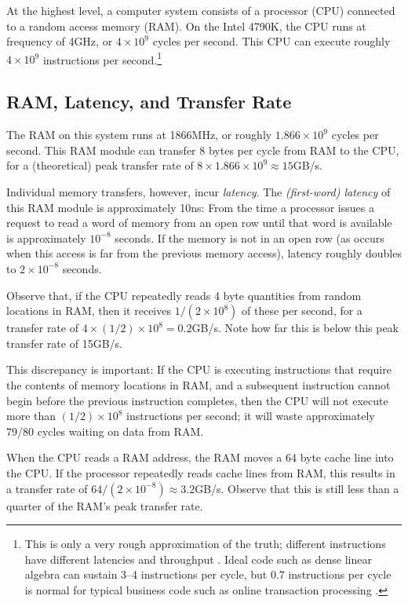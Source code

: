 \documentclass{patmorin}
\begin{document}
At the highest level, a computer system consists of a processor (CPU)
connected to a random access memory (RAM). On the Intel 4790K, the
CPU runs at frequency of 4GHz, or $4\times10^9$ cycles per second.
This CPU can execute roughly $4\times 10^{9}$ instructions per
second.\footnote{This is only a very rough approximation of the
truth; different instructions have different latencies and throughput
\cite{fog:instruction}.  Ideal code such as dense linear algebra can
sustain 3--4 instructions per cycle, but 0.7 instructions per cycle is
normal for typical business code such as online transaction processing
\cite{tozun.pandis.ea:from}.}



\subsection{RAM, Latency, and Transfer Rate}

The RAM on this system runs at 1866MHz, or roughly $1.866\times10^9$
cycles per second.  This RAM module can transfer 8 bytes per cycle
from RAM to the CPU, for a (theoretical) peak transfer rate of $8\times
1.866\times10^9\approx 15$GB/s.

Individual memory transfers, however, incur \emph{latency}.
The \emph{(first-word) latency} of this RAM module is approximately
10ns: From the time a processor issues a request to read a word of
memory from an open row until that word is available is approximately
$10^{-8}$ seconds.  If the memory is not in an open row (as occurs when
this access is far from the previous memory access), latency roughly
doubles to $2\times 10^{-8}$ seconds.

Observe that, if the CPU repeatedly reads 4 byte quantities from random
locations in RAM, then it receives $1/(2\times 10^8)$ of these per second,
for a transfer rate of $4\times(1/2)\times10^8=0.2$GB/s.  Note how far
this is below this peak transfer rate of 15GB/s.

This discrepancy is important: If the CPU is executing instructions
that require the contents of memory locations in RAM, and a subsequent
instruction cannot begin before the previous instruction completes, then
the CPU will not execute more than $(1/2)\times 10^8$ instructions per
second; it will waste approximately 79/80 cycles waiting on data from RAM.

When the CPU reads a RAM address, the RAM moves a 64 byte cache line into
the CPU.  If the processor repeatedly reads cache lines from RAM, this
results in a transfer rate of $64 / (2\times10^{-8}) \approx 3.2$GB/s.
Observe that this is still less than a quarter of the RAM's peak transfer
rate.
\end{document}
